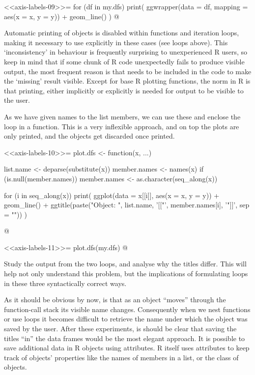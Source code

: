 \begin{explainbox}
<<axis-labels-09>>=
for (df in my.dfs) {
  print(
    ggwrapper(data = df,
              mapping = aes(x = x, y = y)) +
      geom_line()
  )
}
@

\begin{warningbox}
 Automatic printing of objects is disabled within functions and iteration loops, making it necessary to use  explicitly in these cases (see loops above). This `inconsistency' in behaviour is frequently surprising to unexperienced R users, so keep in mind that if some chunk of R code unexpectedly fails to produce visible output, the most frequent reason is that  needs to be included in the code to make the `missing' result visible. Except for base R plotting functions, the norm in R is that printing, either implicitly or explicitly is needed for output to be visible to the user.
\end{warningbox}

As we have given names to the list members, we can use these and enclose the loop in a function. This is a very inflexible approach, and on top the plots are only printed, and the  objects get discarded once printed.

<<axis-labels-10>>=
plot.dfs <- function(x, ...) {
list.name <- deparse(substitute(x))
member.names <- names(x)
if (is.null(member.names)) {
  member.names <- as.character(seq_along(x))
}

  for (i in seq_along(x)) {
    print(
      ggplot(data = x[[i]], aes(x = x, y = y)) +
        geom_line() +
        ggtitle(paste("Object: ", list.name,
                      '[["', member.names[i], '"]]', sep = ""))
    )
  }

}
@

<<axis-labels-11>>=
plot.dfs(my.dfs)
@

\begin{playground}
Study the output from the two loops, and analyse why the titles differ. This will help not only understand this problem, but the implications of formulating  loops in these three syntactically correct ways.
\end{playground}

As it should be obvious by now, is that as an object ``moves'' through the function-call stack its visible name changes. Consequently when we nest functions or use loops it becomes difficult to retrieve the name under which the object was saved by the user. After these experiments, is should be clear that saving the titles ``in'' the data frames would be the most elegant approach. It is possible to save additional data in R objects using attributes. R itself uses attributes to keep track of objects' properties like the names of members in a list, or the class of objects.


\end{explainbox}
